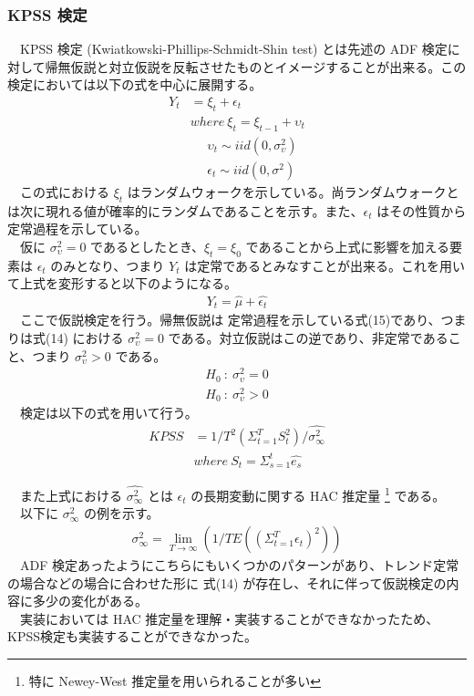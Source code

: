 \documentclass{scrartcl}
\begin{document}
\subsubsection{KPSS 検定}
\label{sec:orgf9c28bf}
　KPSS 検定 (Kwiatkowski-Phillips-Schmidt-Shin test) とは先述の ADF 検定に対して帰無仮説と対立仮説を反転させたものとイメージすることが出来る。この検定においては以下の式を中心に展開する。\\
\begin{align}
Y_t &= \xi_t + \epsilon_t \nonumber \\
 &where \ \xi_t = \xi_{t-1} + \upsilon_t \nonumber \\
 &\ \ \ \ \ \ \upsilon_t \sim iid(0, \sigma_{\upsilon}^2)\nonumber \\
 &\ \ \ \ \ \ \epsilon_t \sim iid(0, \sigma^2)
\end{align}
　この式における \(\xi_t\) はランダムウォークを示している。尚ランダムウォークとは次に現れる値が確率的にランダムであることを示す。また、\(\epsilon_t\) はその性質から定常過程を示している。\\
　仮に \(\sigma_{\upsilon}^2 = 0\) であるとしたとき、\(\xi_t = \xi_0\) であることから上式に影響を加える要素は \(\epsilon_t\) のみとなり、つまり \(Y_t\) は定常であるとみなすことが出来る。これを用いて上式を変形すると以下のようになる。\\
\begin{align}
Y_t = \hat{\mu} + \hat{\epsilon_t}
\end{align}
　ここで仮説検定を行う。帰無仮説は 定常過程を示している式(15)であり、つまりは式(14) における \(\sigma_{\upsilon}^2 = 0\) である。対立仮説はこの逆であり、非定常であること、つまり \(\sigma_{\upsilon}^2 > 0\) である。\\
\begin{align}
H_0 \ :\ \sigma_{\upsilon}^2 = 0 \\
H_0 \ :\ \sigma_{\upsilon}^2 > 0
\end{align}
　検定は以下の式を用いて行う。\\
\begin{align}
KPSS &= 1/T^2 (\Sigma^{T}_{t = 1}S_t^2)/ \hat{\sigma^2_\infty} \nonumber \\ 
&where\  S_t = \Sigma_{s=1}^t \hat{e_s} 
\end{align}

　また上式における \(\hat{\sigma^2_\infty}\) とは \(\epsilon_t\) の長期変動に関する HAC 推定量 \footnote{特に Newey-West 推定量を用いられることが多い} である。\\
　以下に \(\sigma^2_\infty\) の例を示す。\cite{STAN:STAN272}
\begin{align}
\sigma^2_\infty = \lim_{T \rightarrow \infty} (1/T E((\Sigma_{t=1}^T \epsilon_t)^2))
\end{align}
　ADF 検定あったようにこちらにもいくつかのパターンがあり、トレンド定常の場合などの場合に合わせた形に 式(14) が存在し、それに伴って仮説検定の内容に多少の変化がある。\\
　実装においては HAC 推定量を理解・実装することができなかったため、KPSS検定も実装することができなかった。\\
\end{document}
